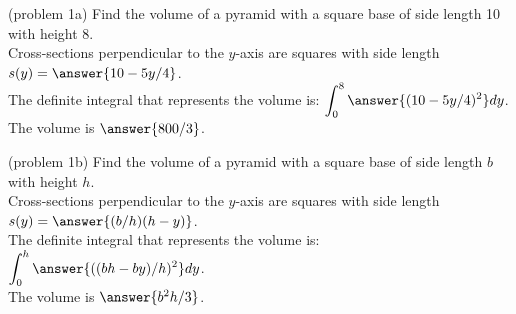 \documentclass{ximera}
\begin{document}
 
 
\begin{problem}(problem 1a) Find the volume of a pyramid with a square base of side length 10 with height 8.\\
Cross-sections perpendicular to the $y$-axis are squares with side length $s(y) = \answer{10 - 5y/4}$.\\
The definite integral that represents the volume is: $\displaystyle{\int_0^8 \answer{(10 - 5y/4)^2} dy}$.\\
The volume is $\answer{800/3}$.
\end{problem}


\begin{problem}(problem 1b) Find the volume of a pyramid with a square base of side length $b$ with height $h$.\\
Cross-sections perpendicular to the $y$-axis are squares with side length $s(y) = \answer{ (b/h)(h-y)}$.\\
The definite integral that represents the volume is: $\displaystyle{\int_0^h \answer{((bh-by)/h)^2} dy}$.\\
The volume is $\answer{b^2h/3}$.
\end{problem}
\end{document}
